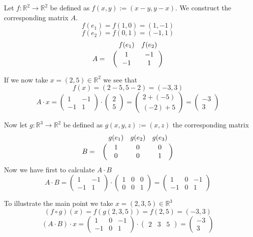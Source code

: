 \begin{example}
   Let \(f: \mathbb{R}^2 \to \mathbb{R}^2\) be defined as \(f(x, y) := (x - y, y - x)\).
   We construct the corresponding matrix \(A\).
   \[f(e_1) = f(1, 0) = (1, -1)\]
   \[f(e_2) = f(0, 1) = (-1, 1)\]
   \[A = \bordermatrix{
         ~ & f(e_1)  & f(e_2) \cr
           & 1       & -1     \cr
           & -1      & 1      \cr
   }\]

   If we now take \(x = (2, 5) \in \mathbb{R}^2\) we see that
   \[f(x) = (2 - 5, 5 - 2) = (-3, 3)\]
   \[A \cdot x = \begin{pmatrix} 1 & -1 \\ -1 & 1\end{pmatrix} \cdot \begin{pmatrix}2 \\ 5\end{pmatrix} = \begin{pmatrix}2 + (-5) \\ (-2) + 5\end{pmatrix} = \begin{pmatrix}-3 \\ 3\end{pmatrix}\]

   Now let \(g: \mathbb{R}^3 \to \mathbb{R}^2\) be defined as \(g(x, y, z) := (x, z)\) the corresponding matrix
   \[B = \bordermatrix{
         ~ & g(e_1) & g(e_2) & g(e_3) \cr
           & 1      & 0      & 0      \cr
           & 0      & 0      & 1      \cr
   }\]
   Now we have first to calculate \(A \cdot B\)
   \[A \cdot B = \begin{pmatrix}1 & -1 \\ -1 & 1\end{pmatrix} \cdot \begin{pmatrix}1 & 0 & 0\\ 0 & 0 & 1\end{pmatrix} = \begin{pmatrix}1 & 0 & -1\\ -1 & 0 & 1\end{pmatrix}\]

   To illustrate the main point we take \(x = (2, 3, 5) \in \mathbb{R}^3\)
   \[(f \circ g)(x) = f(g(2, 3, 5)) = f(2, 5) = (-3, 3)\]
   \[(A \cdot B) \cdot x = \begin{pmatrix}1 & 0 & -1\\ -1 & 0 & 1\end{pmatrix} \cdot \begin{pmatrix}2 & 3 & 5\end{pmatrix} = \begin{pmatrix}-3\\3\end{pmatrix}\]
\end{example}

